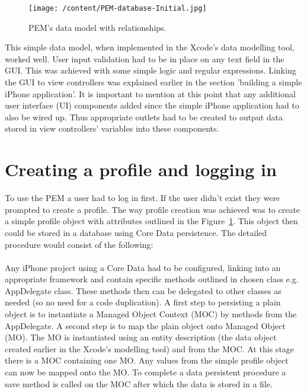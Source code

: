 \documentclass[12pt, a4paper]{report}   %
\begin{document}
\begin{enumerate}
\begin{figure}[H]
  \centering
	\texttt{[image: /content/PEM-database-Initial.jpg]}
	  \caption{PEM's data model with relationships.}
	  \label{PEM-database-Initial}
\end{figure}


This simple data model, when implemented in the Xcode's data modelling tool, worked well. User input validation had to be in place on any text field in the GUI. This was achieved with some simple logic and regular expressions. Linking the GUI to view controllers was explained earlier in the section 'building a simple iPhone application'. It is important to mention at this point that any additional user interface (UI) components added since the simple iPhone application had to also be wired up. Thus appropriate outlets had to be created to output data stored in view controllers' variables into these components.


\clearpage
\section{Creating a profile and logging in}
To use the PEM a user had to log in first. If the user didn't exist they were prompted to create a profile. The way profile creation was achieved was to create a simple profile object with attributes outlined in the Figure~\ref{PEM-database-Initial}. This object then could be stored in a database using Core Data persistence. The detailed procedure would consist of the following:\\ \\
Any iPhone project using a Core Data had to be configured, linking into an appropriate framework and contain specific methods outlined in chosen class e.g. AppDelegate class. These methods then can be delegated to other classes as needed (so no need for a code duplication). A first step to persisting a plain object is to instantiate a Managed Object Context (MOC) by methods from the AppDelegate. A second step is to map the plain object onto Managed Object (MO). The MO is instantiated using an entity description (the data object created earlier in the Xcode's modelling tool) and from the MOC. At this stage there is a MOC containing one MO. Any values from the simple profile object can now be mapped onto the MO. To complete a data persistent procedure a save method is called on the MOC after which the data is stored in a file.\\ \\



\end{enumerate}
\end{document}
